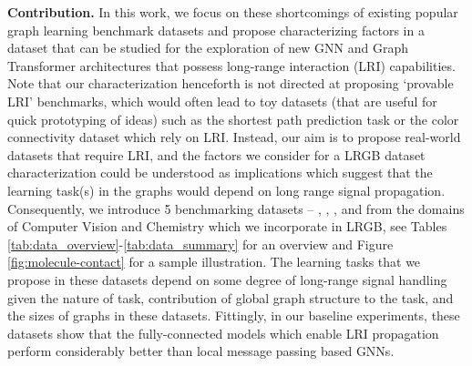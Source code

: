 \documentclass{article}
\begin{document}
\textbf{Contribution.} In this work, we focus on these shortcomings of existing popular graph learning benchmark datasets and propose characterizing factors in a dataset that can be studied for the exploration of new GNN and Graph Transformer architectures that possess long-range interaction (LRI) capabilities. Note that our characterization henceforth is not directed at proposing `provable LRI' benchmarks, which would often lead to toy datasets (that are useful for quick prototyping of ideas)
such as the shortest path prediction task \cite{stachenfeld2020graph} or the color connectivity dataset \cite{rampavsek2021hierarchical} which rely on LRI. Instead, our aim is to propose real-world datasets that require LRI, and the factors we consider for a LRGB dataset characterization could be understood as implications which suggest that the learning task(s) in the graphs would depend on long range signal propagation.
Consequently, we introduce 5 benchmarking datasets -- \pascal, \coco, \pcqmcontact, \pepfunc and \pepstruct from the domains of Computer Vision and Chemistry which we incorporate in LRGB, see Tables \ref{tab:data_overview}-\ref{tab:data_summary} for an overview and Figure \ref{fig:molecule-contact} for a sample illustration. The learning tasks that we propose in these datasets depend on some degree of long-range signal handling given the nature of task, contribution of global graph structure to the task, and the sizes of graphs in these datasets. Fittingly, in our baseline experiments, these datasets show that the fully-connected models which enable LRI propagation perform considerably better than local message passing based GNNs.
\end{document}
